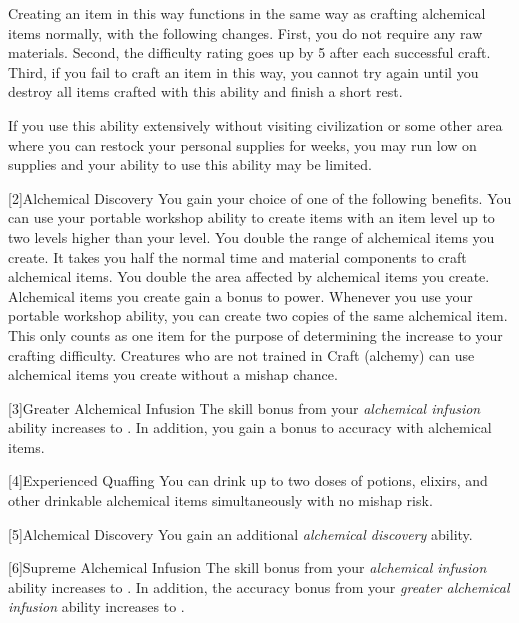         Creating an item in this way functions in the same way as crafting alchemical items normally, with the following changes.
        First, you do not require any raw materials.
        Second, the difficulty rating goes up by 5 after each successful craft.
        Third, if you fail to craft an item in this way, you cannot try again until you destroy all items crafted with this ability and finish a short rest.

        If you use this ability extensively without visiting civilization or some other area where you can restock your personal supplies for weeks, you may run low on supplies and your ability to use this ability may be limited.

        [2]{Alchemical Discovery} You gain your choice of one of the following benefits.
        {
             You can use your portable workshop ability to create items with an item level up to two levels higher than your level.
             You double the range of alchemical items you create.
             It takes you half the normal time and material components to craft alchemical items.
             You double the area affected by alchemical items you create.
             Alchemical items you create gain a  bonus to power.
             Whenever you use your portable workshop ability, you can create two copies of the same alchemical item.
            This only counts as one item for the purpose of determining the increase to your crafting difficulty.
             Creatures who are not trained in Craft (alchemy) can use alchemical items you create without a mishap chance.
        }

        [3]{Greater Alchemical Infusion} The skill bonus from your \textit{alchemical infusion} ability increases to .
        In addition, you gain a  bonus to accuracy with alchemical items.

        [4]{Experienced Quaffing} You can drink up to two doses of potions, elixirs, and other drinkable alchemical items simultaneously with no mishap risk.

        [5]{Alchemical Discovery} You gain an additional \textit{alchemical discovery} ability.

        [6]{Supreme Alchemical Infusion} The skill bonus from your \textit{alchemical infusion} ability increases to .
        In addition, the accuracy bonus from your \textit{greater alchemical infusion} ability increases to .

